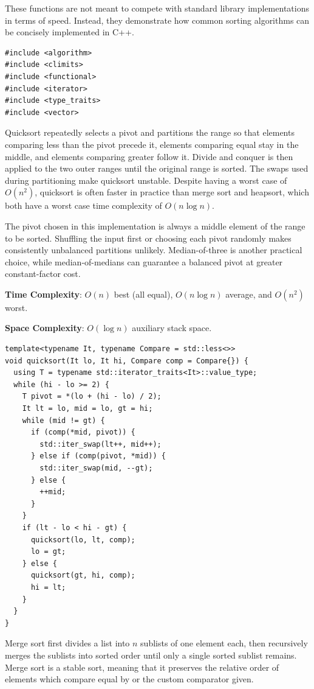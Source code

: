 These functions are not meant to compete with standard library implementations in terms of speed. Instead, they demonstrate how common sorting algorithms can be concisely implemented in C++.

\begin{lstlisting}[style=cpp]
#include <algorithm>
#include <climits>
#include <functional>
#include <iterator>
#include <type_traits>
#include <vector>
\end{lstlisting}
Quicksort repeatedly selects a pivot and partitions the range so that elements comparing less than the pivot precede it, elements comparing equal stay in the middle, and elements comparing greater follow it. Divide and conquer is then applied to the two outer ranges until the original range is sorted. The swaps used during partitioning make quicksort unstable. Despite having a worst case of $O(n^{2})$, quicksort is often faster in practice than merge sort and heapsort, which both have a worst case time complexity of $O(n \log n)$.

The pivot chosen in this implementation is always a middle element of the range to be sorted. Shuffling the input first or choosing each pivot randomly makes consistently unbalanced partitions unlikely. Median-of-three is another practical choice, while median-of-medians can guarantee a balanced pivot at greater constant-factor cost.

\textbf{Time Complexity}: $O(n)$ best (all equal), $O(n \log n)$ average, and $O(n^{2})$ worst.

\textbf{Space Complexity}: $O(\log n)$ auxiliary stack space.

\begin{lstlisting}[style=cpp]
template<typename It, typename Compare = std::less<>>
void quicksort(It lo, It hi, Compare comp = Compare{}) {
  using T = typename std::iterator_traits<It>::value_type;
  while (hi - lo >= 2) {
    T pivot = *(lo + (hi - lo) / 2);
    It lt = lo, mid = lo, gt = hi;
    while (mid != gt) {
      if (comp(*mid, pivot)) {
        std::iter_swap(lt++, mid++);
      } else if (comp(pivot, *mid)) {
        std::iter_swap(mid, --gt);
      } else {
        ++mid;
      }
    }
    if (lt - lo < hi - gt) {
      quicksort(lo, lt, comp);
      lo = gt;
    } else {
      quicksort(gt, hi, comp);
      hi = lt;
    }
  }
}
\end{lstlisting}
Merge sort first divides a list into $n$ sublists of one element each, then recursively merges the sublists into sorted order until only a single sorted sublist remains. Merge sort is a stable sort, meaning that it preserves the relative order of elements which compare equal by  or the custom comparator given.

